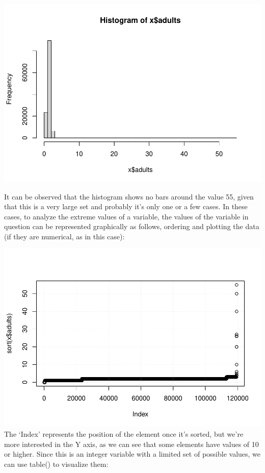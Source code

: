 \documentclass[
]{article}
\newenvironment{Shaded}{\begin{snugshade}}{\end{snugshade}}
\newcommand{\FunctionTok}[1]{\textcolor[rgb]{0.13,0.29,0.53}{\textbf{#1}}}
\newcommand{\NormalTok}[1]{#1}
\newcommand{\SpecialCharTok}[1]{\textcolor[rgb]{0.81,0.36,0.00}{\textbf{#1}}}
\begin{document}
\includegraphics{hotel_bookings_files/figure-latex/hist_adults-1.pdf}

It can be observed that the histogram shows no bars around the value 55,
given that this is a very large set and probably it's only one or a few
cases. In these cases, to analyze the extreme values of a variable, the
values of the variable in question can be represented graphically as
follows, ordering and plotting the data (if they are numerical, as in
this case):

\begin{Shaded}
\end{Shaded}

\includegraphics{hotel_bookings_files/figure-latex/plot_adults-1.pdf}
The `Index' represents the position of the element once it's sorted, but
we're more interested in the Y axis, as we can see that some elements
have values of 10 or higher. Since this is an integer variable with a
limited set of possible values, we can use table() to visualize them:
\end{document}
